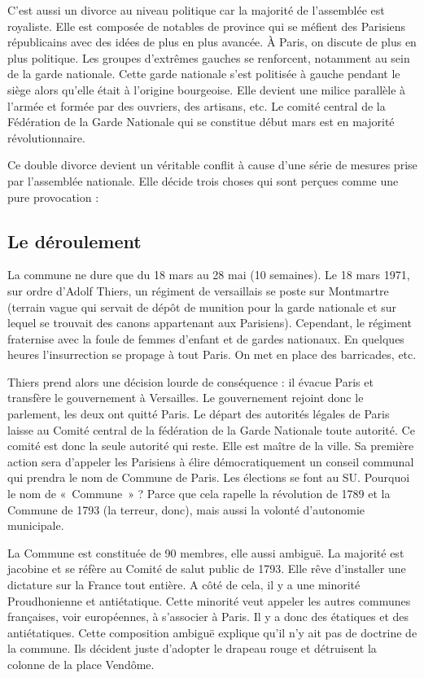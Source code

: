 \documentclass[12pt]{report}
\begin{document}
C'est aussi un divorce au niveau politique car la majorité de l’assemblée est royaliste. Elle est composée de
notables de province qui se méfient des Parisiens républicains avec des idées de plus
en plus avancée. À Paris, on discute de plus en plus politique. Les groupes d’extrêmes
gauches se renforcent, notamment au sein de la garde nationale. Cette garde nationale
s’est politisée à gauche pendant le siège alors qu’elle était à l’origine bourgeoise. Elle
devient une milice parallèle à l’armée et formée par des ouvriers, des artisans, etc. Le
comité central de la Fédération de la Garde Nationale qui se constitue début mars est
en majorité révolutionnaire.

Ce double divorce devient un véritable conflit à cause d’une série de mesures prise par
l’assemblée nationale. Elle décide trois choses qui sont perçues comme une pure provocation :

\subsection{Le déroulement}

La commune ne dure que du 18 mars au 28 mai (10 semaines). Le 18 mars 1971, sur ordre
d’Adolf Thiers, un régiment de versaillais se poste sur Montmartre (terrain vague qui servait
de dépôt de munition pour la garde nationale et sur lequel se trouvait des canons
appartenant aux Parisiens). Cependant, le régiment fraternise avec la foule de femmes
d’enfant et de gardes nationaux. En quelques heures l’insurrection se propage à tout Paris. On
met en place des barricades, etc.

Thiers prend alors une décision lourde de conséquence : il évacue Paris et transfère le
gouvernement à Versailles. Le gouvernement rejoint donc le parlement, les deux ont quitté
Paris. Le départ des autorités légales de Paris laisse au Comité central de la fédération de la
Garde Nationale toute autorité. Ce comité est donc la seule autorité qui reste. Elle est maître
de la ville. Sa première action sera d’appeler les Parisiens à élire démocratiquement un conseil
communal qui prendra le nom de Commune de Paris. Les élections se font au SU. Pourquoi le nom de «~Commune~» ?
Parce que cela rapelle la révolution de 1789 et la Commune de 1793 (la terreur, donc), mais aussi la volonté d'autonomie municipale.

La Commune est constituée de 90 membres, elle aussi ambiguë. La majorité est jacobine et se
réfère au Comité de salut public de 1793. Elle rêve d’installer une dictature sur la France tout
entière. A côté de cela, il y a une minorité Proudhonienne et antiétatique. Cette minorité veut
appeler les autres communes françaises, voir européennes, à s’associer à Paris. Il y a donc des
étatiques et des antiétatiques. Cette composition ambiguë explique qu’il n’y ait pas de
doctrine de la commune. Ils décident juste d’adopter le drapeau rouge et détruisent la colonne
de la place Vendôme.
\end{document}
